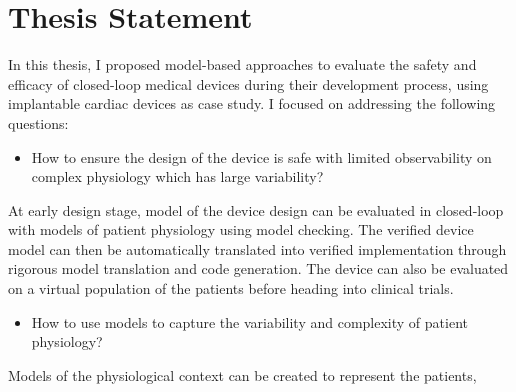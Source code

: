 \documentclass[a4paper]{article}
\begin{document}
\section*{Thesis Statement}
In this thesis, I proposed model-based approaches to evaluate the safety and efficacy of closed-loop medical devices during their development process, using implantable cardiac devices as case study.
I focused on addressing the following questions:
\begin{itemize}
\item How to ensure the design of the device is safe with limited observability on complex physiology which has large variability? 
\end{itemize}
At early design stage, model of the device design can be evaluated in closed-loop with models of patient physiology using model checking.
The verified device model can then be automatically translated into verified implementation through rigorous model translation and code generation.
The device can also be evaluated on a virtual population of the patients before heading into clinical trials.
\begin{itemize}
\item How to use models to capture the variability and complexity of patient physiology?
\end{itemize}
Models of the physiological context can be created to represent the patients,
\end{document}
